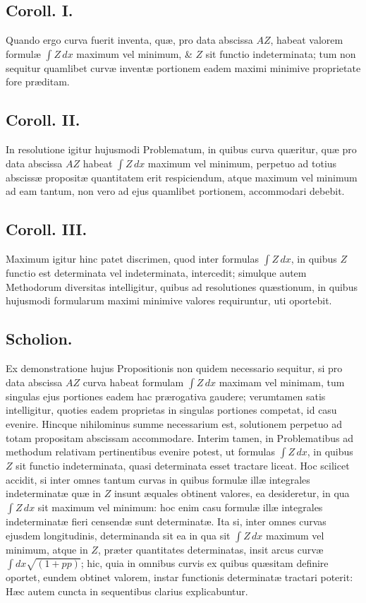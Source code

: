 \subsection*{Coroll. I.}
Quando ergo curva fuerit inventa, quæ, pro data abscissa $AZ$, habeat valorem formulæ $\int Z\,dx$ maximum vel minimum, \& $Z$ sit functio indeterminata; tum non sequitur quamlibet curvæ inventæ portionem eadem maximi minimive proprietate fore præditam.

\subsection*{Coroll. II.}
In resolutione igitur hujusmodi Problematum, in quibus curva quæritur, quæ pro data abscissa $AZ$ habeat $\int Z\,dx$ maximum vel minimum, perpetuo ad totius abscissæ propositæ quantitatem erit respiciendum, atque maximum vel minimum ad eam tantum, non vero ad ejus quamlibet portionem, accommodari debebit.

\subsection*{Coroll. III.}
Maximum igitur hinc patet discrimen, quod inter formulas $\int Z\,dx$, in quibus $Z$ functio est determinata vel indeterminata, intercedit; simulque autem Methodorum diversitas intelligitur, quibus ad resolutiones quæstionum, in quibus hujusmodi formularum maximi minimive valores requiruntur, uti oportebit.

\subsection*{Scholion.}
Ex demonstratione hujus Propositionis non quidem necessario sequitur, si pro data abscissa $AZ$ curva habeat formulam $\int Z\,dx$ maximam vel minimam, tum singulas ejus portiones eadem hac prærogativa gaudere; verumtamen satis intelligitur, quoties eadem proprietas in singulas portiones competat, id casu evenire.
Hincque nihilominus summe necessarium est, solutionem perpetuo ad totam propositam abscissam accommodare. Interim tamen, in Problematibus ad methodum relativam pertinentibus evenire potest, ut formulas $\int Z\,dx$, in quibus $Z$ sit functio indeterminata, quasi determinata esset tractare liceat. Hoc scilicet accidit, si inter omnes tantum curvas in quibus formulæ illæ integrales indeterminatæ quæ in $Z$ insunt æquales obtinent valores, ea desideretur, in qua $\int Z\,dx$ sit maximum vel minimum: hoc enim casu formulæ illæ integrales indeterminatæ fieri censendæ sunt determinatæ. Ita si, inter omnes curvas ejusdem longitudinis, determinanda sit ea in qua sit $\int Z\,dx$ maximum vel minimum, atque in $Z$, præter quantitates determinatas, insit arcus curvæ $\int dx\sqrt{(1+pp)}$; hic, quia in omnibus curvis ex quibus quæsitam definire oportet, eundem obtinet valorem, instar functionis determinatæ tractari poterit: Hæc autem cuncta in sequentibus clarius explicabuntur.

